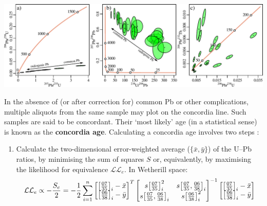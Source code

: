 \begin{refsection}
\noindent\includegraphics[width=\textwidth]{../figures/3xconcordia.pdf}
\begingroup {}\endgroup

In the absence of (or after correction for) common Pb or other
complications, multiple aliquots from the same sample may plot on the
concordia line. Such samples are said to be concordant. Their `most
likely' age (in a statistical sense) is known as the \textbf{concordia
  age}. Calculating a concordia age involves two steps
\citep{ludwig1998}:

\begin{enumerate}
  \item Calculate the two-dimensional error-weighted average
    ($\{\bar{x},\bar{y}\}$) of the U--Pb ratios, by minimising the sum
    of squares $S$ or, equivalently, by maximising the likelihood for
    equivalence 
    $\mathcal{LL}_e$. In Wetherill space:
    \begin{equation}
      \mathcal{LL}_e \propto - \frac{S_e}{2} =
      -\frac{1}{2}\sum\limits_{i=1}^{n} \left[
      \begin{array}{@{}c@{}}
        \left[\frac{07}{35}\right]_i-\bar{x}\\
        \left[\frac{06}{38}\right]_i-\bar{y}
      \end{array}
      \right]^T
    \left[
      \begin{array}{@{}cc@{}}
        s\!\left[\frac{07}{35}\right]_i^2 &
        s\!\left[\frac{07}{35},\frac{06}{38}\right]_i\\
        s\!\left[\frac{07}{35},\frac{06}{38}\right]_i &
        s\!\left[\frac{06}{38}\right]_i^2
      \end{array}
      \right]^{-1}
    \left[
      \begin{array}{@{}c@{}}
        \left[\frac{07}{35}\right]_i-\bar{x}\\
        \left[\frac{06}{38}\right]_i-\bar{y}
      \end{array}
      \right]    
    \end{equation}


\end{enumerate}
\end{refsection}

